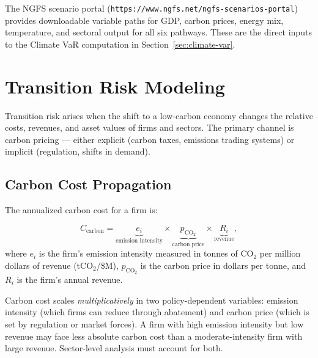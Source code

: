 \documentclass[11pt, a4paper]{article}
\theoremstyle{definition}
\theoremstyle{plain}
\theoremstyle{remark}
\begin{document}
\begin{refbox}
The NGFS scenario portal (\texttt{https://www.ngfs.net/ngfs-scenarios-portal})
provides downloadable variable paths for GDP, carbon prices, energy mix,
temperature, and sectoral output for all six pathways.
These are the direct inputs to the Climate VaR computation in
Section~\ref{sec:climate-var}.
\end{refbox}


\section{Transition Risk Modeling}
\label{sec:transition-risk}

Transition risk arises when the shift to a low-carbon economy changes the
relative costs, revenues, and asset values of firms and sectors.
The primary channel is carbon pricing --- either explicit (carbon taxes, emissions
trading systems) or implicit (regulation, shifts in demand).

\subsection{Carbon Cost Propagation}

The annualized carbon cost for a firm is:

\begin{equation}\label{eq:carbon-cost}
    C_{\text{carbon}} = \underbrace{e_i}_{\text{emission intensity}}
    \times \underbrace{p_{\text{CO}_2}}_{\text{carbon price}}
    \times \underbrace{R_i}_{\text{revenue}},
\end{equation}
where $e_i$ is the firm's emission intensity measured in tonnes of CO$_2$ per
million dollars of revenue (tCO$_2$/\$M), $p_{\text{CO}_2}$ is the carbon price
in dollars per tonne, and $R_i$ is the firm's annual revenue.

\begin{keyidea}
Carbon cost scales \emph{multiplicatively} in two policy-dependent variables:
emission intensity (which firms can reduce through abatement) and carbon price
(which is set by regulation or market forces).
A firm with high emission intensity but low revenue may face less absolute carbon
cost than a moderate-intensity firm with large revenue.
Sector-level analysis must account for both.
\end{keyidea}
\end{document}
